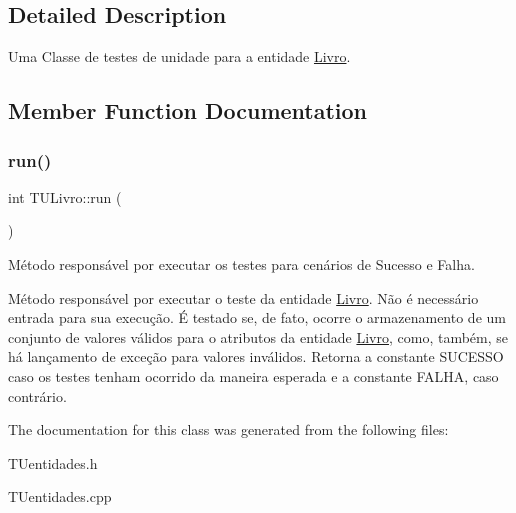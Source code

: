 \subsection{Detailed Description}
Uma Classe de testes de unidade para a entidade \hyperlink{classLivro}{Livro}. 

\subsection{Member Function Documentation}
\mbox{\label{classTULivro_ab5966f07d89cd055f1cb35bdf0769169}} 
\subsubsection{\texorpdfstring{run()}{run()}}
{\footnotesize\ttfamily int T\+U\+Livro\+::run (\begin{DoxyParamCaption}{ }\end{DoxyParamCaption})}



Método responsável por executar os testes para cenários de Sucesso e Falha. 

Método responsável por executar o teste da entidade \hyperlink{classLivro}{Livro}. Não é necessário entrada para sua execução. É testado se, de fato, ocorre o armazenamento de um conjunto de valores válidos para o atributos da entidade \hyperlink{classLivro}{Livro}, como, também, se há lançamento de exceção para valores inválidos. Retorna a constante S\+U\+C\+E\+S\+SO caso os testes tenham ocorrido da maneira esperada e a constante F\+A\+L\+HA, caso contrário. 

The documentation for this class was generated from the following files\+:\begin{DoxyCompactItemize}
\item 
T\+Uentidades.\+h\item 
T\+Uentidades.\+cpp\end{DoxyCompactItemize}
